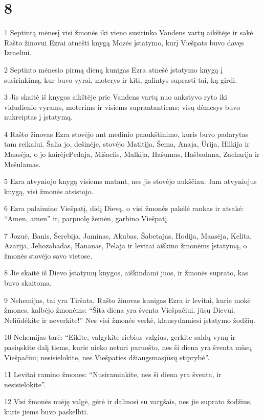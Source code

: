 \chapter{8}


\par 1 Septintą mėnesį visi žmonės iki vieno susirinko Vandens vartų aikštėje ir sakė Rašto žinovui Ezrai atnešti knygą Mozės įstatymo, kurį Viešpats buvo davęs Izraeliui. 
\par 2 Septinto mėnesio pirmą dieną kunigas Ezra atnešė įstatymo knygą į susirinkimą, kur buvo vyrai, moterys ir kiti, galintys suprasti tai, ką girdi. 
\par 3 Jis skaitė iš knygos aikštėje prie Vandens vartų nuo ankstyvo ryto iki vidudienio vyrams, moterims ir visiems suprantantiems; visų dėmesys buvo nukreiptas į įstatymą. 
\par 4 Rašto žinovas Ezra stovėjo ant medinio paaukštinimo, kuris buvo padarytas tam reikalui. Šalia jo, dešinėje, stovėjo Matitija, Šema, Anaja, Ūrija, Hilkija ir Maasėja, o jo kairėje­Pedaja, Mišaelis, Malkija, Hašumas, Hašbadana, Zacharija ir Mešulamas. 
\par 5 Ezra atvyniojo knygą visiems matant, nes jis stovėjo aukščiau. Jam atvyniojus knygą, visi žmonės atsistojo. 
\par 6 Ezra palaimino Viešpatį, didį Dievą, o visi žmonės pakėlė rankas ir atsakė: “Amen, amen” ir, parpuolę žemėn, garbino Viešpatį. 
\par 7 Jozuė, Banis, Šerebija, Jaminas, Akubas, Šabetajas, Hodija, Maasėja, Kelita, Azarija, Jehozabadas, Hananas, Pelaja ir levitai aiškino žmonėms įstatymą, o žmonės stovėjo savo vietose. 
\par 8 Jie skaitė iš Dievo įstatymų knygos, aiškindami juos, ir žmonės suprato, kas buvo skaitoma. 
\par 9 Nehemijas, tai yra Tiršata, Rašto žinovas kunigas Ezra ir levitai, kurie mokė žmones, kalbėjo žmonėms: “Šita diena yra šventa Viešpačiui, jūsų Dievui. Neliūdėkite ir neverkite!” Nes visi žmonės verkė, klausydamiesi įstatymo žodžių. 
\par 10 Nehemijas tarė: “Eikite, valgykite riebius valgius, gerkite saldų vyną ir pasiųskite dalį tiems, kurie nieko neturi paruošto, nes ši diena yra šventa mūsų Viešpačiui; nesisielokite, nes Viešpaties džiaugsmas­jūsų stiprybė”. 
\par 11 Levitai ramino žmones: “Nusiraminkite, nes ši diena yra šventa, ir nesisielokite”. 
\par 12 Visi žmonės nuėję valgė, gėrė ir dalinosi su vargšais, nes jie suprato žodžius, kurie jiems buvo paskelbti. 
